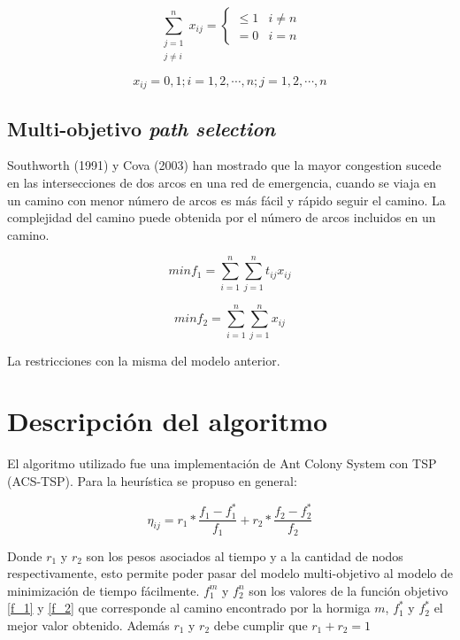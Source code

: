 \documentclass[letter, 10pt]{article}
\begin{document}
\begin{equation}\label{circles}
	\sum_{\substack{j=1\\
                  j \neq i}}^n x_{ij} = \begin{cases}
\leq 1 & i\neq n\\
=0 & i=n 
\end{cases}
\end{equation}

\begin{equation}
	x_{ij} = 0,1;i=1,2,\cdots,n;j=1,2,\cdots,n
\end{equation}

\subsection{Multi-objetivo \textit{path selection}}

Southworth (1991) \cite{southworth1991regional} y Cova (2003) han mostrado que la mayor congestion sucede en las intersecciones de dos arcos en una red de emergencia, cuando se viaja en un camino con menor número de arcos es más fácil y rápido seguir el camino. La complejidad del camino puede obtenida por el número de arcos incluidos en un camino. 


\begin{equation}\label{f_1}
	min f_1 = \sum_{i=1}^{n}\sum_{j=1}^{n} t_{ij}x_{ij}
\end{equation}


\begin{equation}\label{f_2}
	min f_2 = \sum_{i=1}^{n}\sum_{j=1}^{n} x_{ij}
\end{equation}

La restricciones con la misma del modelo anterior.

\section{Descripción del algoritmo}

El algoritmo utilizado fue una implementación de Ant Colony System con TSP (ACS-TSP). Para la heurística se propuso en general:

\begin{equation}
	\eta_{ij} = r_1*\frac{f_1 - f_1^*}{f_1} + r_2*\frac{f_2 - f_2^*}{f_2}
\end{equation}

Donde $r_1$ y $r_2$ son los pesos asociados al tiempo y a la cantidad de nodos respectivamente, esto permite poder pasar del modelo multi-objetivo al modelo de minimización de tiempo fácilmente.  $f_1^m$ y $f_2^n$ son los valores de la función objetivo \eqref{f_1} y \eqref{f_2} que corresponde al camino encontrado por la hormiga $m$, $f_1^*$ y $f_2^*$ el mejor valor obtenido. Además $r_1$ y $r_2$ debe cumplir que $r_1 + r_2 = 1$
\end{document}
